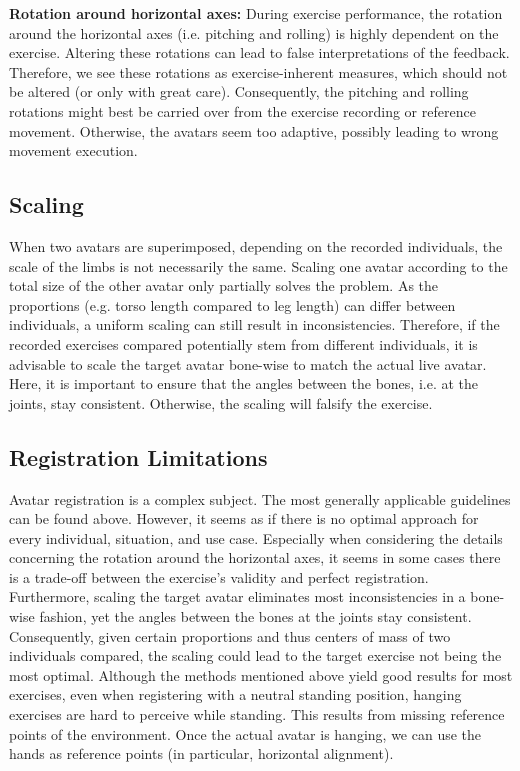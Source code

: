\textbf{Rotation around horizontal axes:}
During exercise performance, the rotation around the horizontal axes (i.e. pitching and rolling) is highly dependent on the exercise. Altering these rotations can lead to false interpretations of the feedback. Therefore, we see these rotations as exercise-inherent measures, which should not be altered (or only with great care). Consequently, the pitching and rolling rotations might best be carried over from the exercise recording or reference movement. Otherwise, the avatars seem too adaptive, possibly leading to wrong movement execution.

\subsection*{Scaling}
When two avatars are superimposed, depending on the recorded individuals, the scale of the limbs is not necessarily the same. Scaling one avatar according to the total size of the other avatar only partially solves the problem. As the proportions (e.g. torso length compared to leg length) can differ between individuals, a uniform scaling can still result in inconsistencies. Therefore, if the recorded exercises compared potentially stem from different individuals, it is advisable to scale the target avatar bone-wise to match the actual live avatar. Here, it is important to ensure that the angles between the bones, i.e. at the joints,  stay consistent. Otherwise, the scaling will falsify the exercise. 

\subsection*{Registration Limitations}
Avatar registration is a complex subject. The most generally applicable guidelines can be found above. However, it seems as if there is no optimal approach for every individual, situation, and use case. Especially when considering the details concerning the rotation around the horizontal axes, it seems in some cases there is a trade-off between the exercise's validity and perfect registration.
Furthermore, scaling the target avatar eliminates most inconsistencies in a bone-wise fashion, yet the angles between the bones at the joints stay consistent. Consequently, given certain proportions and thus centers of mass of two individuals compared, the scaling could lead to the target exercise not being the most optimal. Although the methods mentioned above yield good results for most exercises, even when registering with a neutral standing position, hanging exercises are hard to perceive while standing. This results from missing reference points of the environment. Once the actual avatar is hanging, we can use the hands as reference points (in particular, horizontal alignment).

